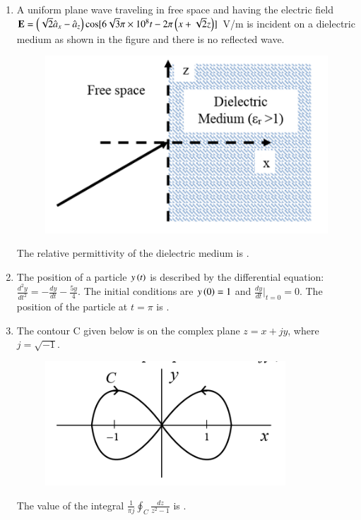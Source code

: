 \documentclass[a4paper, 11pt]{article}
\begin{document}
\begin{enumerate}
    \item A uniform plane wave traveling in free space and having the electric field $\mathbf{E} = \left(\sqrt{2}\hat{a}_x - \hat{a}_z\right)\cos[6\sqrt{3}\pi \times 10^8 t - 2\pi\left(x+\sqrt{2}z\right)]$ V/m is incident on a dielectric medium  as shown in the figure and there is no reflected wave.
    \begin{figure}[H]
        \centering
        \includegraphics[width=0.5\columnwidth]{figs/q49.png}
        \caption*{}
        \label{fig:q49}
    \end{figure}
    The relative permittivity  of the dielectric medium is \underline{\hspace{2cm}}.

    \hfill{}
    
    \item The position of a particle $y\left(t\right)$ is described by the differential equation: $\frac{d^2y}{dt^2} = -\frac{dy}{dt} - \frac{5y}{4}$. The initial conditions are $y\left(0\right)=1$ and $\frac{dy}{dt}|_{t=0} = 0$. The position  of the particle at $t=\pi$ is \underline{\hspace{2cm}}.

    \hfill{}

    \item The contour C given below is on the complex plane $z=x+jy$, where $j=\sqrt{-1}$.
    \begin{figure}[H]
        \centering
        \includegraphics[width=0.4\columnwidth]{figs/q51.png}
        \caption*{}
        \label{fig:q51}
    \end{figure}
    The value of the integral $\frac{1}{\pi j} \oint_C \frac{dz}{z^2-1}$ is \underline{\hspace{2cm}}.
    

\end{enumerate}
\end{document}
